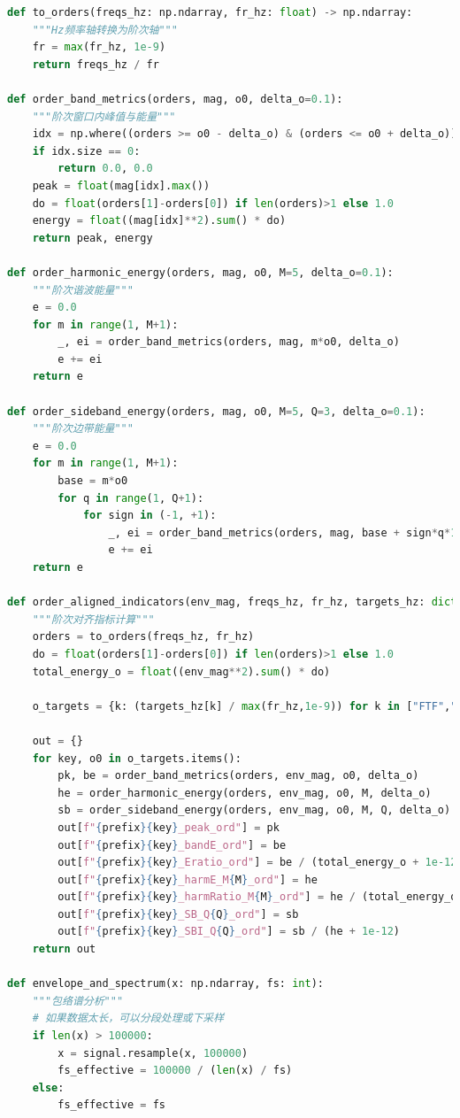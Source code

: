 \documentclass[a4paper]{CPIPC}
\numberwithin{equation}{section}
\begin{document}
\begin{lstlisting}[language=Python, caption=Target Domain Feature Extraction]
def to_orders(freqs_hz: np.ndarray, fr_hz: float) -> np.ndarray:
    """Hz频率轴转换为阶次轴"""
    fr = max(fr_hz, 1e-9)
    return freqs_hz / fr

def order_band_metrics(orders, mag, o0, delta_o=0.1):
    """阶次窗口内峰值与能量"""
    idx = np.where((orders >= o0 - delta_o) & (orders <= o0 + delta_o))[0]
    if idx.size == 0: 
        return 0.0, 0.0
    peak = float(mag[idx].max())
    do = float(orders[1]-orders[0]) if len(orders)>1 else 1.0
    energy = float((mag[idx]**2).sum() * do)
    return peak, energy

def order_harmonic_energy(orders, mag, o0, M=5, delta_o=0.1):
    """阶次谐波能量"""
    e = 0.0
    for m in range(1, M+1):
        _, ei = order_band_metrics(orders, mag, m*o0, delta_o)
        e += ei
    return e

def order_sideband_energy(orders, mag, o0, M=5, Q=3, delta_o=0.1):
    """阶次边带能量"""
    e = 0.0
    for m in range(1, M+1):
        base = m*o0
        for q in range(1, Q+1):
            for sign in (-1, +1):
                _, ei = order_band_metrics(orders, mag, base + sign*q*1.0, delta_o)
                e += ei
    return e

def order_aligned_indicators(env_mag, freqs_hz, fr_hz, targets_hz: dict, delta_o=0.1, M=5, Q=3, prefix=""):
    """阶次对齐指标计算"""
    orders = to_orders(freqs_hz, fr_hz)
    do = float(orders[1]-orders[0]) if len(orders)>1 else 1.0
    total_energy_o = float((env_mag**2).sum() * do)

    o_targets = {k: (targets_hz[k] / max(fr_hz,1e-9)) for k in ["FTF","BPFO","BPFI","BSF"]}

    out = {}
    for key, o0 in o_targets.items():
        pk, be = order_band_metrics(orders, env_mag, o0, delta_o)
        he = order_harmonic_energy(orders, env_mag, o0, M, delta_o)
        sb = order_sideband_energy(orders, env_mag, o0, M, Q, delta_o)
        out[f"{prefix}{key}_peak_ord"] = pk
        out[f"{prefix}{key}_bandE_ord"] = be
        out[f"{prefix}{key}_Eratio_ord"] = be / (total_energy_o + 1e-12)
        out[f"{prefix}{key}_harmE_M{M}_ord"] = he
        out[f"{prefix}{key}_harmRatio_M{M}_ord"] = he / (total_energy_o + 1e-12)
        out[f"{prefix}{key}_SB_Q{Q}_ord"] = sb
        out[f"{prefix}{key}_SBI_Q{Q}_ord"] = sb / (he + 1e-12)
    return out

def envelope_and_spectrum(x: np.ndarray, fs: int):
    """包络谱分析"""
    # 如果数据太长，可以分段处理或下采样
    if len(x) > 100000:
        x = signal.resample(x, 100000)
        fs_effective = 100000 / (len(x) / fs)
    else:
        fs_effective = fs
    

\end{lstlisting}
\end{document}
